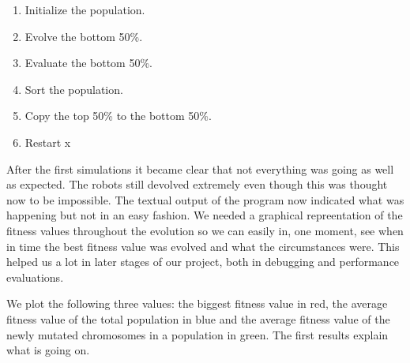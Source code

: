 \documentclass[a4paper,10pt]{article}
\begin{document}
\begin{enumerate}
    \item Initialize the population.
    \item Evolve the bottom 50\%.
    \item Evaluate the bottom 50\%.
    \item Sort the population.
    \item Copy the top 50\% to the bottom 50\%.
    \item Restart x 
\end{enumerate}

After the first simulations it became clear that not everything was going as well as expected. The robots still devolved extremely even though this was thought now to be 
impossible. The textual output of the program now indicated what was happening but not in an easy fashion. We needed a graphical repreentation of the fitness values 
throughout the evolution so we can easily in, one moment, see when in time the best fitness value was evolved and what the circumstances were. This helped us a lot in later
stages of our project, both in debugging and performance evaluations.

We plot the following three values: the biggest fitness value in red, the average fitness value of the total population in blue and the average fitness value of the 
newly mutated chromosomes in a population in green. The first results explain what is going on.
  
\end{document}
